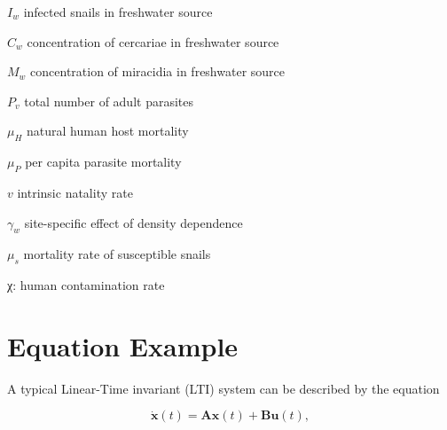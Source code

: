\documentclass[12pt]{article}
\begin{document}
$I_w$ infected snails in freshwater source

$C_w$ concentration of cercariae in freshwater source

$M_w$  concentration of miracidia in freshwater source

$P_v$ total number of adult parasites

$\mu_H$ natural human host mortality

$\mu_P$ per capita parasite mortality

$v$ intrinsic natality rate

$\gamma_w$ site-specific effect of density dependence

$\mu_s$ mortality rate of susceptible snails







χ: human contamination rate



\section{Equation Example}

A typical Linear-Time invariant (LTI) system can be described by the equation

\begin{equation}\label{eq:ltiSys}
\dot{\mathbf{x}}(t) = \mathbf{A} \mathbf{x}(t) + \mathbf{B} \mathbf{u}(t),
\end{equation}
\end{document}

